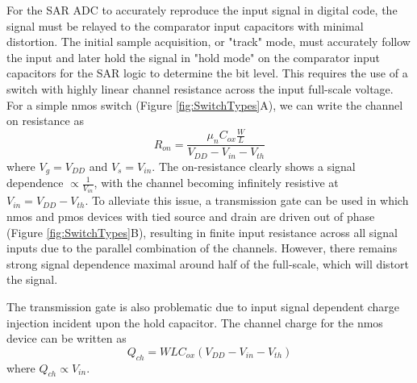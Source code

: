 \documentclass[10pt,journal]{IEEEtran}\usepackage{longtable}
\begin{document}
For the SAR ADC to accurately reproduce the input signal in digital code, the signal must be relayed to the comparator input capacitors with minimal distortion. The initial sample acquisition, or "track" mode, must accurately follow the input and later hold the signal in "hold mode" on the comparator input capacitors for the SAR logic to determine the bit level. This requires the use of a switch with highly linear channel resistance across the input full-scale voltage. For a simple nmos switch (Figure \ref{fig:SwitchTypes}A), we can write the channel on resistance as
\begin{equation}
R_{on}=\frac{\mu_nC_{ox}\frac{W}{L}}{V_{DD}-V_{in}-V_{th}}
\label{eq:channel_res}
\end{equation}
where $V_g=V_{DD}$ and $V_{s}=V_{in}$. The on-resistance clearly shows a signal dependence $\propto\frac{1}{V_{in}}$, with the channel becoming infinitely resistive at $V_{in}=V_{DD}-V_{th}$. To alleviate this issue, a transmission gate can be used in which nmos and pmos devices with tied source and drain are driven out of phase (Figure \ref{fig:SwitchTypes}B), resulting in finite input resistance across all signal inputs due to the parallel combination of the channels. However, there remains strong signal dependence maximal around half of the full-scale, which will distort the signal. 

The transmission gate is also problematic due to input signal dependent charge injection incident upon the hold capacitor. The channel charge for the nmos device can be written as
\begin{equation}
Q_{ch}=WLC_{ox}\left(V_{DD}-V_{in}-V_{th}\right)
\label{eq:charge_inj}
\end{equation}
where $Q_{ch}\propto V_{in}$. 
\end{document}
